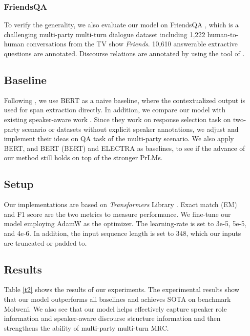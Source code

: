 \documentclass[letterpaper]{article} \usepackage{stylefile}  \usepackage{times}  \usepackage{helvet}  \usepackage{courier}  \usepackage[hyphens]{url}  \usepackage{graphicx} \urlstyle{rm} \def\UrlFont{\rm}  \usepackage{natbib}  \usepackage{caption} \DeclareCaptionStyle{ruled}{labelfont=normalfont,labelsep=colon,strut=off} \frenchspacing  \setlength{\pdfpagewidth}{8.5in}  \setlength{\pdfpageheight}{11in}  \usepackage{algorithm}
\begin{document}
\subsubsection{FriendsQA}
To verify the generality, we also evaluate our model on FriendsQA \cite{yang-choi-2019-friendsqa}, which is a challenging multi-party multi-turn dialogue dataset including 1,222 human-to-human conversations from the TV show \textit{Friends}. 10,610 answerable extractive questions are annotated. Discourse relations are annotated by using the tool of \citet{shi2019deep}.


\subsection{Baseline}
Following \citet{li2020molweni}, we use BERT as a naive baseline, where the contextualized output is used for span extraction directly. In addition, we compare our model with existing speaker-aware work \cite{liumdfn,Gusabert}. Since they work on response selection task on two-party scenario or datasets without explicit speaker annotations, we adjust and implement their ideas on QA task of the multi-party scenario.
We also apply BERT, and BERT (BERT) and ELECTRA \cite{ClarkLLM20} as baselines, to see if the advance of our method still holds on top of the stronger PrLMs.


\subsection{Setup}


Our implementations are based on \textit{Transformers} Library \cite{wolf2020transformers}. Exact match (EM) and F1 score are the two metrics to measure performance. 
We fine-tune our model employing AdamW \cite{adamw} as the optimizer. The learning-rate is set to 3e-5, 5e-5, and 4e-6. In addition, the input sequence length is set to 348, which our inputs are truncated or padded to.



\subsection{Results}
Table \ref{t2} shows the results of our experiments. The experimental results show that our model outperforms all baselines and achieves SOTA on benchmark Molweni. We also see that our model helps effectively capture speaker role information and speaker-aware discourse structure information and then strengthens the ability of multi-party multi-turn MRC.
\end{document}
